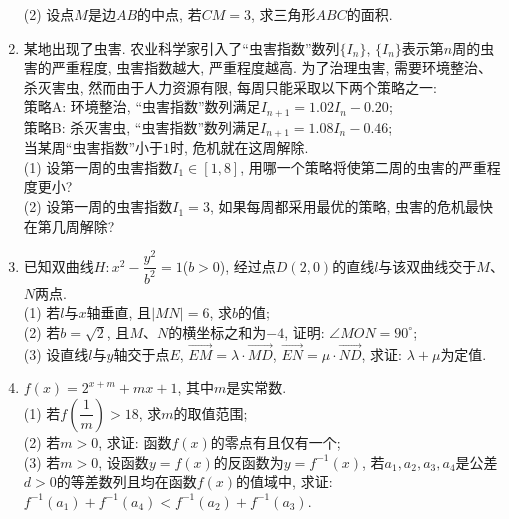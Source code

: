 \documentclass[10pt,a4paper]{article}
\begin{document}
\begin{enumerate}[1.]
(2) 设点$M$是边$AB$的中点, 若$CM=3$, 求三角形$ABC$的面积.
\item 某地出现了虫害. 农业科学家引入了``虫害指数''数列$\{I_n\}$, $\{I_n\}$表示第$n$周的虫害的严重程度, 虫害指数越大, 严重程度越高. 为了治理虫害, 需要环境整治、杀灭害虫, 然而由于人力资源有限, 每周只能采取以下两个策略之一:\\
策略A: 环境整治, ``虫害指数''数列满足$I_{n+1}=1.02I_n-0.20$;\\
策略B: 杀灭害虫, ``虫害指数''数列满足$I_{n+1}=1.08I_n-0.46$;\\
当某周``虫害指数''小于$1$时, 危机就在这周解除.\\
(1) 设第一周的虫害指数$I_1\in [1,8]$, 用哪一个策略将使第二周的虫害的严重程度更小?\\
(2) 设第一周的虫害指数$I_1=3$, 如果每周都采用最优的策略, 虫害的危机最快在第几周解除?
\item 已知双曲线$H:x^2-\dfrac{y^2}{b^2}=1$($b>0$), 经过点$D(2,0)$的直线$l$与该双曲线交于$M$、$N$两点.\\
(1) 若$l$与$x$轴垂直, 且$|MN|=6$, 求$b$的值;\\
(2) 若$b=\sqrt 2$, 且$M$、$N$的横坐标之和为$-4$, 证明: $\angle MON=90^\circ$;\\
(3) 设直线$l$与$y$轴交于点$E$, $\overrightarrow{EM}=\lambda \cdot \overrightarrow{MD}$, $\overrightarrow{EN}=\mu \cdot \overrightarrow{ND}$, 求证: $\lambda +\mu$为定值.
\item $f(x)=2^{x+m}+m x+1$, 其中$m$是实常数.\\
(1) 若$f(\dfrac 1m)>18$, 求$m$的取值范围;\\
(2) 若$m>0$, 求证: 函数$f(x)$的零点有且仅有一个;\\
(3) 若$m>0$, 设函数$y=f(x)$的反函数为$y=f^{-1}(x)$, 若$a_1,a_2,a_3,a_4$是公差$d>0$的等差数列且均在函数$f(x)$的值域中, 求证: $f^{-1}(a_1)+f^{-1}(a_4)<f^{-1}(a_2)+f^{-1}(a_3)$.


\end{enumerate}
\end{document}
